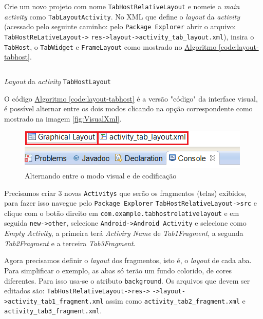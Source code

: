 \documentclass[a4paper,12pt,brazil,oneside]{book}
\begin{document}
	Crie um novo projeto com nome \texttt{TabHostRelativeLayout} e nomeie a \emph{main activity} como \texttt{TabLayoutActivity}. No XML que define o \emph{layout} da \emph{activity} (acessado pelo seguinte caminho: pelo \texttt{Package Explorer} abrir o arquivo: \texttt{TabHostReLativeLayout->} \texttt{res->layout->activity\_tab\_layout.xml}), insira o \texttt{TabHost}, o \texttt{TabWidget} e \texttt{FrameLayout} como mostrado no \hyperref[code:layout-tabhost]{Algoritmo \ref*{code:layout-tabhost}}.
	
	\begin{listing}[H]
	\inputminted[linenos=true,fontsize=\small,frame=lines, framesep=2mm, tabsize=2,numbersep=5pt]{xml}{src/design/activity-tab-host.xml}
	\caption{\emph{Layout} da \emph{activity} \texttt{TabHostLayout}}
	\label{code:layout-tabhost}
	\end{listing}
	
	O código  \hyperref[code:layout-tabhost]{Algoritmo \ref*{code:layout-tabhost}} é a versão "código" da interface visual, é possível alternar entre os dois modos clicando na opção correspondente como mostrado na imagem \autoref{fig:VisualXml}.
	
	\begin{figure}[H]
	  \centering
	  \includegraphics[width=.6\textwidth]{figuras/design/tab-VisualXml.png}
	  \caption{Alternando entre o modo visual e de codificação}
	  \label{fig:VisualXml}
	\end{figure}
	
	Precisamos criar 3 novas \texttt{Activitys} que serão os fragmentos (telas) exibidos, para fazer isso navegue pelo \texttt{Package Explorer} \texttt{TabHostRelativeLayout->src} e clique com o botão direito em \texttt{com.example.tabhostrelativelayout} e em seguida \texttt{new->other}, selecione \texttt{Android->Android Activity} e selecione como \emph{Empty Activity}, a primeira terá \emph{Activiry Name} de \emph{Tab1Fragment}, a segunda  \emph{Tab2Fragment} e a terceira  \emph{Tab3Fragment}.
	
	Agora precisamos definir o \emph{layout} dos fragmentos, isto é, o \emph{layout} de cada aba. Para simplificar o exemplo, as abas só terão um fundo colorido, de cores diferentes. Para isso usa-se o atributo \texttt{background}. Os arquivos que devem ser editados são: \texttt{TabHostRelativeLayout->res->} \texttt{->layout->activity\_tab1\_fragment.xml} assim como \texttt{activity\_tab2\_fragment.xml} e \texttt{activity\_tab3\_fragment.xml}.
	
\end{document}
